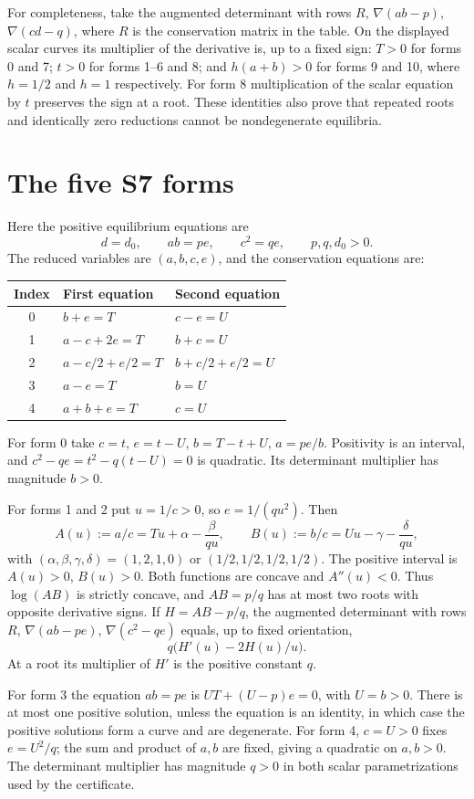 \documentclass[11pt,a4paper]{report}
\begin{document}
For completeness, take the augmented determinant with rows $R$, $\nabla(ab-p)$, $\nabla(cd-q)$,
where $R$ is the conservation matrix in the table. On the displayed scalar curves its multiplier of
the derivative is, up to a fixed sign: $T>0$ for forms 0 and 7; $t>0$ for forms 1--6 and 8;
and $h(a+b)>0$ for forms 9 and 10, where $h=1/2$ and $h=1$ respectively.
For form 8 multiplication of the scalar equation by $t$ preserves the sign at a root.
These identities also prove that repeated roots and identically zero reductions cannot be
nondegenerate equilibria.

\section{The five S7 forms}
Here the positive equilibrium equations are
\[
 d=d_0,\qquad ab=pe,\qquad c^2=qe,\qquad p,q,d_0>0.
\]
The reduced variables are $(a,b,c,e)$, and the conservation equations are:
\begin{center}\small
\begin{tabular}{cll}
\toprule
Index & First equation & Second equation\\
\midrule
0 &$b+e=T$ &$c-e=U$\\
1 &$a-c+2e=T$ &$b+c=U$\\
2 &$a-c/2+e/2=T$ &$b+c/2+e/2=U$\\
3 &$a-e=T$ &$b=U$\\
4 &$a+b+e=T$ &$c=U$\\
\bottomrule
\end{tabular}
\end{center}
For form 0 take $c=t$, $e=t-U$, $b=T-t+U$, $a=pe/b$.
Positivity is an interval, and $c^2-qe=t^2-q(t-U)=0$ is quadratic.
Its determinant multiplier has magnitude $b>0$.

For forms 1 and 2 put $u=1/c>0$, so $e=1/(qu^2)$. Then
\[
 A(u):=a/c=Tu+\alpha-\frac{\beta}{qu},\qquad
 B(u):=b/c=Uu-\gamma-\frac{\delta}{qu},
\]
with $(\alpha,\beta,\gamma,\delta)=(1,2,1,0)$ or $(1/2,1/2,1/2,1/2)$.
The positive interval is $A(u)>0$, $B(u)>0$. Both functions are concave and $A''(u)<0$.
Thus $\log(A B)$ is strictly concave, and $A B=p/q$ has at most two roots with opposite
derivative signs. If $H=AB-p/q$, the augmented determinant with rows $R$, $\nabla(ab-pe)$,
$\nabla(c^2-qe)$ equals, up to fixed orientation,
\[
 q\bigl(H'(u)-2H(u)/u\bigr).
\]
At a root its multiplier of $H'$ is the positive constant $q$.

For form 3 the equation $ab=pe$ is $UT+(U-p)e=0$, with $U=b>0$.
There is at most one positive solution, unless the equation is an identity, in which case the
positive solutions form a curve and are degenerate. For form 4, $c=U>0$ fixes $e=U^2/q$;
the sum and product of $a,b$ are fixed, giving a quadratic on $a,b>0$.
The determinant multiplier has magnitude $q>0$ in both scalar parametrizations used by the certificate.
\end{document}
